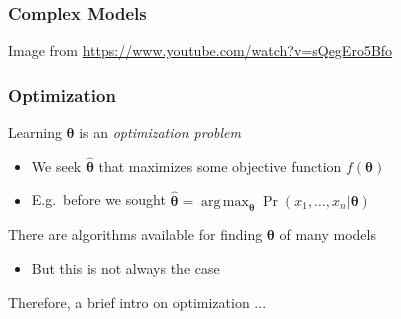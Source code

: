 \documentclass[xetex,professionalfont]{beamer}
\DeclareMathOperator*{\argmax}{arg\,max}
\newcommand{\bth}{\boldsymbol{\theta}}
\begin{document}

\begin{frame}
\frametitle{Complex Models}


\begin{center}
    {\centering Image from \url{https://www.youtube.com/watch?v=sQegEro5Bfo}}
\end{center}

\end{frame}


\begin{frame}
\frametitle{Optimization}

Learning $\bth$ is an \emph{optimization problem}
\begin{itemize}
    \item We seek $\hat{\bth}$ that maximizes some objective function $f(\bth)$ %
    \item E.g.\ before we sought $\hat{\bth}=\argmax_{\bth}\Pr(x_1,\dots,x_n|\bth)$ %
\end{itemize}

\bigskip
There are algorithms available for finding $\bth$ of many models
\begin{itemize}
    \item But this is not always the case %
\end{itemize}

\bigskip
Therefore, a brief intro on optimization ... %

\end{frame}
\end{document}
